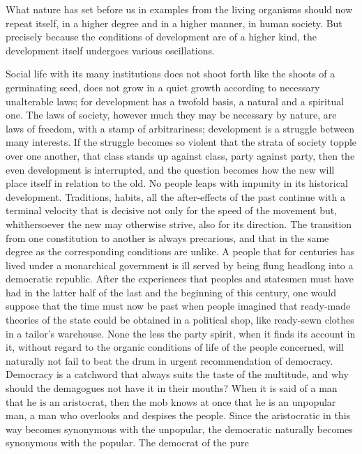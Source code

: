 \documentclass[12pt,a4paper,openany]{book}
\newcommand{\opage}[1]{\marginnote{\footnotesize\textit{[#1]}}}
\begin{document}
What nature has set before us in examples from the
living organisms should now repeat itself, in a higher degree and in a
higher manner, in human society.
But precisely because the conditions of development are
of a higher kind, the development itself undergoes various
oscillations.

Social life with its many institutions does not
shoot forth like the shoots of a germinating seed, does not grow in a
quiet growth according to necessary unalterable laws; for
development has a twofold basis, a natural and
\setcounter{footnote}{0}%
\opage{75}a spiritual one. The laws of society, however
much they may be necessary by nature, are laws of freedom, with a stamp of
arbitrariness; development is a struggle between many
interests. If the struggle becomes so violent that the strata of society
topple over one another, that class stands up
against class, party against party, then the even development
is interrupted, and the question becomes how the
new will place itself in relation to the old. No
people leaps with impunity in its historical development. Traditions,
habits, all the after-effects of the past continue
with a terminal velocity that is decisive
not only for the speed of the movement but, whithersoever
the new may otherwise strive, also for its direction.
The transition from one constitution to another is
always precarious, and that in the same degree as the corresponding
conditions are unlike. A people that for centuries
has lived under a monarchical government is ill
served by being flung headlong into a democratic
republic. After the experiences that peoples and statesmen
must have had in the latter half of the last and
the beginning of this century, one would suppose
that the time must now be past when people imagined
that ready-made theories of the state could be obtained in
a political shop, like ready-sewn clothes in a
tailor's warehouse. None the less the party spirit,
when it finds its account in it, without regard to
the organic conditions of life of the people concerned, will naturally
not fail to beat the drum in urgent
recommendation of democracy. Democracy is a
catchword that always suits the taste of the multitude, and why
should the demagogues not have it in their mouths?
When it is said of a man that he is an aristocrat,
\setcounter{footnote}{0}%
\opage{76}then the mob knows at once that he is an unpopular man,
a man who overlooks and despises the people. Since the
aristocratic in this way becomes synonymous with
the unpopular, the democratic naturally becomes
synonymous with the popular. The democrat of the pure
\end{document}
